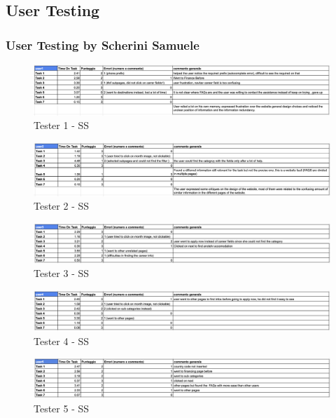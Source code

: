 \documentclass[11pt]{article} %
\begin{document}
\subsection{User Testing}
\subsubsection{User Testing by Scherini Samuele}

\begin{figure}[H]
  \centering
  \includegraphics[width=\textwidth]{Images/Test/TestSS1.png}
  \caption{Tester 1 - SS}
\end{figure}

\begin{figure}[H]
  \centering
  \includegraphics[width=\textwidth]{Images/Test/TestSS2.png}
  \caption{Tester 2 - SS}
\end{figure}

\begin{figure}[H]
  \centering
  \includegraphics[width=\textwidth]{Images/Test/TestSS3.png}
  \caption{Tester 3 - SS}
\end{figure}

\begin{figure}[H]
  \centering
  \includegraphics[width=\textwidth]{Images/Test/TestSS4.png}
  \caption{Tester 4 - SS}
\end{figure}

\begin{figure}[H]
  \centering
  \includegraphics[width=\textwidth]{Images/Test/TestSS5.png}
  \caption{Tester 5 - SS}
\end{figure}
\end{document}
